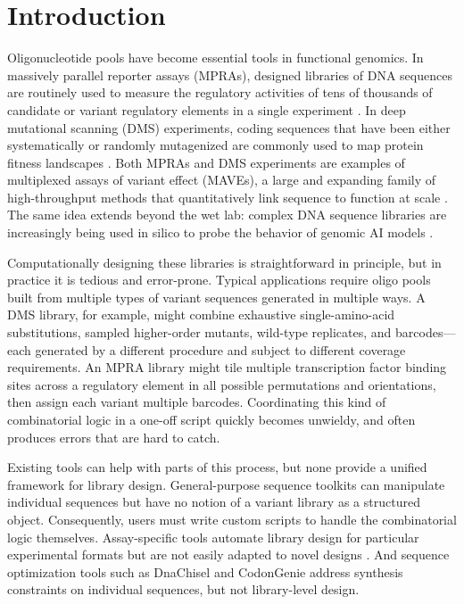 \documentclass[unnumsec,webpdf,modern,large]{mam-authoring-template}%
\theoremstyle{thmstyleone}%
\theoremstyle{thmstyletwo}%
\theoremstyle{thmstylethree}%
\begin{document}
\maketitle

\section{Introduction}

Oligonucleotide pools have become essential tools in functional genomics. In massively parallel reporter assays (MPRAs), designed libraries of DNA sequences are routinely used to measure the regulatory activities of tens of thousands of candidate or variant regulatory elements in a single experiment \citep{Inoue2015cs}. In deep mutational scanning (DMS) experiments, coding sequences that have been either systematically or randomly mutagenized are commonly used to map protein fitness landscapes \citep{Fowler2014gq}. Both MPRAs and DMS experiments are examples of multiplexed assays of variant effect (MAVEs), a large and expanding family of high-throughput methods that quantitatively link sequence to function at scale \citep{Kinney2019jc}. The same idea extends beyond the wet lab: complex DNA sequence libraries are increasingly being used in silico to probe the behavior of genomic AI models \citep{Avsec2021bpnet, Nagai2026review}.

Computationally designing these libraries is straightforward in principle, but in practice it is tedious and error-prone. Typical applications require oligo pools built from multiple types of variant sequences generated in multiple ways. A DMS library, for example, might combine exhaustive single-amino-acid substitutions, sampled higher-order mutants, wild-type replicates, and barcodes---each generated by a different procedure and subject to different coverage requirements. An MPRA library might tile multiple transcription factor binding sites across a regulatory element in all possible permutations and orientations, then assign each variant multiple barcodes. Coordinating this kind of combinatorial logic in a one-off script quickly becomes unwieldy, and often produces errors that are hard to catch.

Existing tools can help with parts of this process, but none provide a unified framework for library design. General-purpose sequence toolkits \citep{Cock2009df, Schreiber2025nd, Pereira2015wj, Klie2023kg} can manipulate individual sequences but have no notion of a variant library as a structured object. Consequently, users must write custom scripts to handle the combinatorial logic themselves. Assay-specific tools automate library design for particular experimental formats but are not easily adapted to novel designs \citep{GeorgakopoulosSoares2017gb, Ghazi2018aa, Barbon2022th}. And sequence optimization tools such as DnaChisel \citep{Zulkower2020jk} and CodonGenie \citep{Swainston2017rb} address synthesis constraints on individual sequences, but not library-level design.
\end{document}
